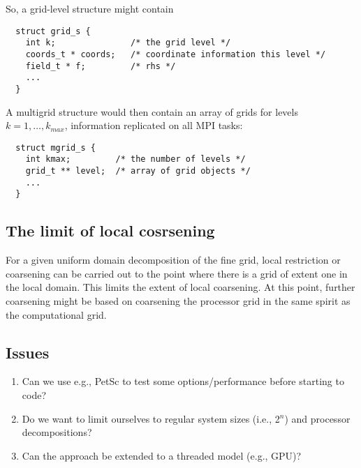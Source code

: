 \documentclass[11pt, oneside, a4paper]{article}
\begin{document}
So, a grid-level structure might contain
\begin{verbatim}
  struct grid_s {
    int k;               /* the grid level */
    coords_t * coords;   /* coordinate information this level */
    field_t * f;         /* rhs */
    ...
  }
\end{verbatim}
A multigrid structure would then contain an array of grids for levels
$k = 1, \ldots, k_{max}$, information replicated on all MPI tasks:
\begin{verbatim}
  struct mgrid_s {
    int kmax;         /* the number of levels */
    grid_t ** level;  /* array of grid objects */
    ...
  }
\end{verbatim}

\subsection{The limit of local cosrsening}

For a given uniform domain decomposition of the fine grid, local
restriction or coarsening can be carried out to the point where
there is a grid of extent one in the local domain. This limits
the extent of local coarsening. At this point, further coarsening
might be based on coarsening the processor grid in the same spirit
as the computational grid.

\subsection{Issues}

\begin{enumerate}
\item
Can we use e.g., PetSc to test some options/performance before starting to
code?
\item
Do we want to limit ourselves to regular system sizes (i.e., 2$^n$)
and processor decompositions?
\item
Can the approach be extended to a threaded model (e.g., GPU)?
\end{enumerate}
\end{document}
